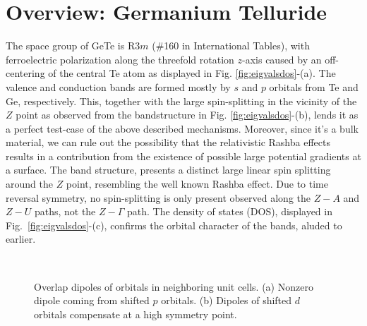 \section{Overview: Germanium Telluride}
The space group of GeTe is R$3m$ (\#160 in International Tables), with ferroelectric polarization along the threefold rotation $z$-axis caused by an off-centering of the central Te atom \cite{Rabe1987} as displayed in Fig. \ref{fig:eigvalsdos}-(a). The valence and conduction bands are formed mostly by $s$ and $p$ orbitals from Te and Ge, respectively. This, together with the large spin-splitting in the vicinity of the $Z$ point \cite{DiSante2013} as observed from the bandstructure in Fig. \ref{fig:eigvalsdos}-(b), lends it as a perfect test-case of the above described mechanisms. Moreover, since it's a bulk material, we can rule out the possibility that the relativistic Rashba effects results in a contribution from the existence of possible large potential gradients at a surface. The band structure,  presents a distinct large linear spin splitting around the $Z$ point, resembling the well known Rashba effect. Due to time reversal symmetry, no spin-splitting is only present observed along the $Z-A$ and $Z-U$ paths, not the $Z-\Gamma$ path.
The density of states (DOS), displayed in Fig.~\ref{fig:eigvalsdos}-(c), confirms the orbital character of the bands, aluded to earlier.
\begin{figure}[t]
~\centering
{}\caption{\label{fig:overlapdip} Overlap dipoles of orbitals in neighboring unit cells. (a) Nonzero dipole coming from shifted $p$ orbitals. (b) Dipoles of shifted $d$ orbitals compensate at a high symmetry point.}
\end{figure}
